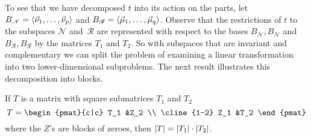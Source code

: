 To see that we have decomposed \( t \) into its action on the parts, 
let $B_{\mathscr{N}}=\langle\vec{\nu}_1,\dots,\vec{\nu}_p\rangle$ and 
$B_{\mathscr{R}}=\langle\vec{\mu}_1,\ldots,\vec{\mu}_q\rangle$.
Observe
that the restrictions of \( t \) to the subspaces \( \mathscr{N} \) 
and~\( \mathscr{R} \) 
are represented
with respect to the bases $B_{\mathscr{N}},B_{\mathscr{N}}$
and $B_{\mathscr{R}},B_{\mathscr{R}}$
by the matrices \( T_1 \) and \( T_2 \).
So with subspaces that are invariant and complementary 
we can split the problem of examining
a linear transformation into two lower-dimensional subproblems.
The next result illustrates this decomposition into blocks.

\begin{lemma} \label{le:DetIsProdOfSubDets}
If $T$ is a matrix with square submatrices $T_1$ and $T_2$
\begin{equation*} \renewcommand{\arraystretch}{1.2}
  T=
  \begin{pmat}{c|c}
      T_1   &Z_2  \\  \cline{1-2}
      Z_1   &T_2
   \end{pmat}
\end{equation*}
where the \( Z \)'s are blocks of zeroes,
then \( \deter{T}=\deter{T_1}\cdot\deter{T_2} \).
\end{lemma}

